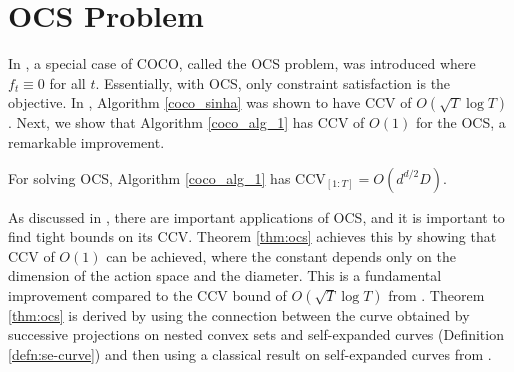 \section{OCS Problem}
In \cite{Sinha2024}, a special case of COCO, called the OCS problem, was introduced where $f_t\equiv0$ for all $t$. Essentially, with OCS, only constraint satisfaction is the objective.  In \cite{Sinha2024}, Algorithm \ref{coco_sinha} was shown to have CCV of $O(\sqrt{T}\log T)$. Next, we show that Algorithm \ref{coco_alg_1} has CCV of $O(1)$ for the OCS, a remarkable improvement.

 \begin{theorem}\label{thm:ocs}
For solving OCS, Algorithm \ref{coco_alg_1} has $\text{CCV}_{[1:T]}= O\left(d^{d/2} D\right)$.
\end{theorem}

As discussed in \cite{Sinha2024}, there are important applications of OCS, and it is important to find tight bounds on its CCV. Theorem \ref{thm:ocs} achieves this by showing that CCV of $O(1)$ can be achieved, where the constant depends only on the dimension of the action space and the diameter. This is a fundamental improvement compared to the CCV bound of $O(\sqrt{T}\log T)$ from \cite{Sinha2024}. Theorem  \ref{thm:ocs} is derived by using the connection between the curve obtained by successive projections on nested convex sets and self-expanded curves (Definition \ref{defn:se-curve}) and then using a classical result on self-expanded curves from \cite{Manselli}.

 